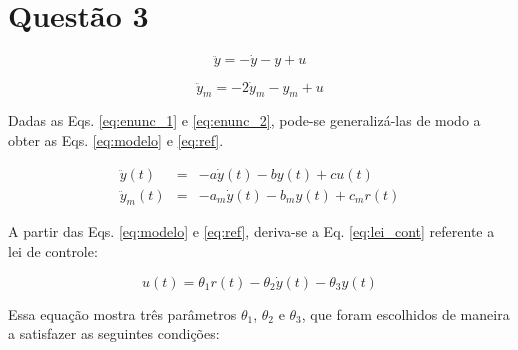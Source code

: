 
\chapter*{Questão 3}

\begin{equation}\label{eq:enunc_1}
\ddot{y} = -\dot{y} - y  + u 
\end{equation}


\begin{equation}\label{eq:enunc_2}
\ddot{y}_m = -2\dot{y}_m - y_m  + u
\end{equation}


\vspace{0.5cm}


\vspace{0.25cm}

Dadas as Eqs. \ref{eq:enunc_1} e \ref{eq:enunc_2}, pode-se generalizá-las de
modo a obter as Eqs. \ref{eq:modelo} e \ref{eq:ref}.

\begin{eqnarray}
\ddot{y}(t) & = &-a\dot{y}(t) - by(t) + cu(t) \label{eq:modelo}\\
\ddot{y}_m(t) & = &-a_m\dot{y}(t) - b_my(t) + c_mr(t) \label{eq:ref}
\end{eqnarray}

A partir das Eqs. \ref{eq:modelo} e \ref{eq:ref}, deriva-se a Eq.
\ref{eq:lei_cont} referente a lei de controle:

\begin{equation}\label{eq:lei_cont}
u(t) = \theta_1r(t) - \theta_2\dot{y}(t) - \theta_3y(t)
\end{equation}

Essa equação mostra três parâmetros $\theta_1$, $\theta_2$ e $\theta_3$, que
foram escolhidos de maneira a satisfazer as seguintes condições:

